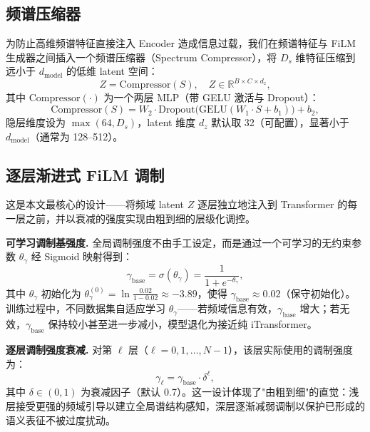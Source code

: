 \subsection{频谱压缩器}
\label{subsec:spectrum_compressor}

为防止高维频谱特征直接注入 Encoder 造成信息过载，我们在频谱特征与 FiLM 生成器之间插入一个频谱压缩器（Spectrum Compressor），将 \(D_s\) 维特征压缩到远小于 \(d_{\text{model}}\) 的低维 latent 空间：
\begin{equation}
  Z = \mathrm{Compressor}(S), \quad
  Z \in \mathbb{R}^{B \times C \times d_z},
\end{equation}
其中 \(\mathrm{Compressor}(\cdot)\) 为一个两层 MLP（带 GELU 激活与 Dropout）：
\begin{equation}
  \mathrm{Compressor}(S) = W_2 \cdot \mathrm{Dropout}\big(\mathrm{GELU}(W_1 \cdot S + b_1)\big) + b_2,
\end{equation}
隐层维度设为 \(\max(64, D_s)\)，latent 维度 \(d_z\) 默认取 32（可配置），显著小于 \(d_{\text{model}}\)（通常为 128--512）。

\subsection{逐层渐进式 FiLM 调制}
\label{subsec:progressive_film}

这是本文最核心的设计——将频域 latent \(Z\) 逐层独立地注入到 Transformer 的每一层之前，并以衰减的强度实现由粗到细的层级化调控。

\medskip\noindent\textbf{可学习调制基强度.}
全局调制强度不由手工设定，而是通过一个可学习的无约束参数 \(\theta_{\gamma}\) 经 Sigmoid 映射得到：
\begin{equation}
  \gamma_{\text{base}} = \sigma(\theta_{\gamma}) = \frac{1}{1 + e^{-\theta_{\gamma}}},
\end{equation}
其中 \(\theta_{\gamma}\) 初始化为 \(\theta_{\gamma}^{(0)} = \ln\frac{0.02}{1-0.02} \approx -3.89\)，使得 \(\gamma_{\text{base}} \approx 0.02\)（保守初始化）。训练过程中，不同数据集自适应学习 \(\theta_{\gamma}\)——若频域信息有效，\(\gamma_{\text{base}}\) 增大；若无效，\(\gamma_{\text{base}}\) 保持较小甚至进一步减小，模型退化为接近纯 iTransformer。

\medskip\noindent\textbf{逐层调制强度衰减.}
对第 \(\ell\) 层（\(\ell = 0, 1, \dots, N-1\)），该层实际使用的调制强度为：
\begin{equation}
  \gamma_{\ell} = \gamma_{\text{base}} \cdot \delta^{\ell},
\end{equation}
其中 \(\delta \in (0, 1)\) 为衰减因子（默认 0.7）。这一设计体现了"由粗到细"的直觉：浅层接受更强的频域引导以建立全局谱结构感知，深层逐渐减弱调制以保护已形成的语义表征不被过度扰动。

